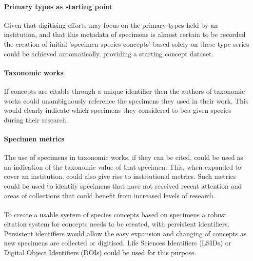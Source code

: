 \documentclass{article}
\begin{document}
   \paragraph{Primary types as starting point}
   Given that digitising efforts may focus on the primary types held by an institution, and that this metadata of specimens is almost certain to be recorded the creation of initial 'specimen species concepts' based solely on these type series could be achieved automatically, providing a starting concept dataset.
   
   \paragraph{Taxonomic works}
   If concepts are citable through a unique identifier then the authors of taxonomic works could unambiguously reference the specimens they used in their work. This would clearly indicate which specimens they considered to bea given species during their research.
   
   \paragraph{Specimen metrics}
   The use of specimens in taxonomic works, if they can be cited, could be used as an indication of the taxonomic value of that specimen. This, when expanded to cover an institution, could also give rise to institutional metrics. Such metrics could be used to identify specimens that have not received recent attention and areas of collections that could benefit from increased levels of research.
   
   \paragraph{}
   To create a usable system of species concepts based on specimens a robust citation system for concepts needs to be created, with persistent identifiers. Persistent identifiers would allow the easy expansion and changing of concepts as new specimens are collected or digitised. Life Sciences Identifiers (LSIDs) or Digital Object Identifiers (DOIs) could be used for this purpose.
   \printbibliography{}
\end{document}
